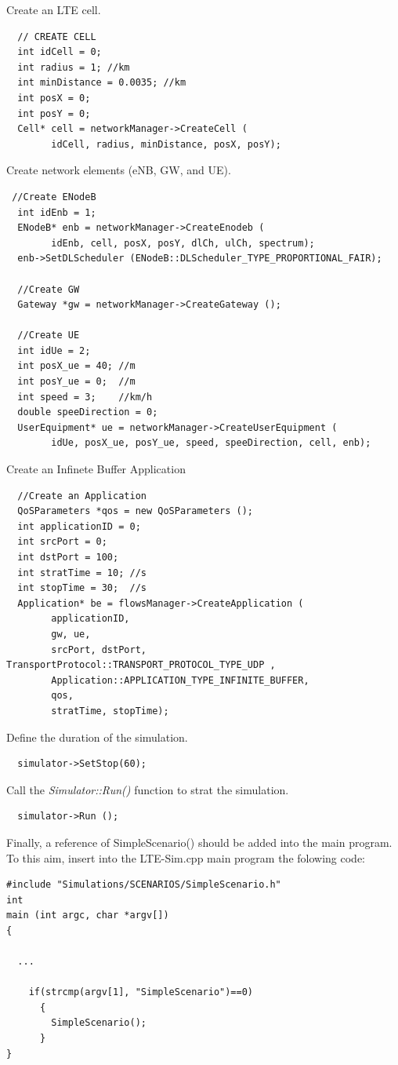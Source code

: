 \documentclass[11pt]{article}
\begin{document}
Create an LTE cell.
\color{blue}
\begin{lstlisting}
  // CREATE CELL
  int idCell = 0;
  int radius = 1; //km
  int minDistance = 0.0035; //km
  int posX = 0;
  int posY = 0;
  Cell* cell = networkManager->CreateCell (
		idCell, radius, minDistance, posX, posY);
\end{lstlisting}
\color{black}

Create network elements (eNB, GW, and UE).
\color{blue}
\begin{lstlisting}
 //Create ENodeB
  int idEnb = 1;
  ENodeB* enb = networkManager->CreateEnodeb (
		idEnb, cell, posX, posY, dlCh, ulCh, spectrum);
  enb->SetDLScheduler (ENodeB::DLScheduler_TYPE_PROPORTIONAL_FAIR);

  //Create GW
  Gateway *gw = networkManager->CreateGateway ();

  //Create UE
  int idUe = 2;
  int posX_ue = 40; //m
  int posY_ue = 0;  //m
  int speed = 3;    //km/h
  double speeDirection = 0;
  UserEquipment* ue = networkManager->CreateUserEquipment (
		idUe, posX_ue, posY_ue, speed, speeDirection, cell, enb);
\end{lstlisting}
\color{black}



Create an Infinete Buffer Application

\color{blue}
\begin{lstlisting}
  //Create an Application
  QoSParameters *qos = new QoSParameters ();
  int applicationID = 0;
  int srcPort = 0;
  int dstPort = 100;
  int stratTime = 10; //s
  int stopTime = 30;  //s
  Application* be = flowsManager->CreateApplication (
		applicationID,
		gw, ue,
		srcPort, dstPort, TransportProtocol::TRANSPORT_PROTOCOL_TYPE_UDP ,
		Application::APPLICATION_TYPE_INFINITE_BUFFER,
		qos,
		stratTime, stopTime);

\end{lstlisting}
\color{black}

Define the duration of the simulation.
\color{blue}
\begin{lstlisting}
  simulator->SetStop(60);
\end{lstlisting}
\color{black}

Call the \emph{Simulator::Run()} function to strat the simulation.
\color{blue}
\begin{lstlisting}
  simulator->Run ();
\end{lstlisting}
\color{black}

Finally, a reference of SimpleScenario() should be added into the main program. To this aim, insert into the LTE-Sim.cpp main program the folowing code:

\color{blue}
\begin{lstlisting}
#include "Simulations/SCENARIOS/SimpleScenario.h"
int
main (int argc, char *argv[])
{

  ...

	if(strcmp(argv[1], "SimpleScenario")==0)
	  {
   	    SimpleScenario();
	  }
}
\end{lstlisting}
\color{black}
\end{document}
